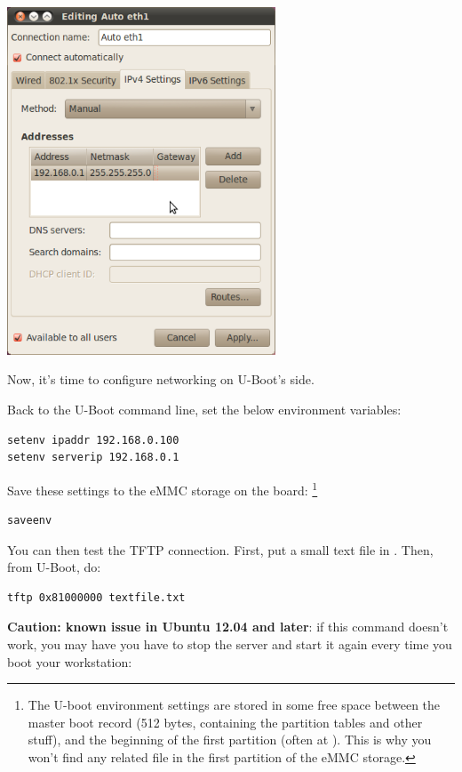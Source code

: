 \begin{center}
\includegraphics[width=8cm]{labs/kernel-board-setup/network-config-3.png}
\end{center}

Now, it's time to configure networking on U-Boot's side.

Back to the U-Boot command line, set the below environment variables:

\begin{verbatim}
setenv ipaddr 192.168.0.100
setenv serverip 192.168.0.1
\end{verbatim}

Save these settings to the eMMC storage on the board:
\footnote{The U-boot environment settings are stored in some free space
between the master boot record (512 bytes, containing the partition
tables and other stuff), and the beginning of the first partition (often
at ). This is why you won't find any related file in the
first partition of the eMMC storage.}

\begin{verbatim}
saveenv
\end{verbatim}

You can then test the TFTP connection.  First, put a small text
file in . Then, from U-Boot, do:

\begin{verbatim}
tftp 0x81000000 textfile.txt
\end{verbatim}

{\bf Caution: known issue in Ubuntu 12.04 and later}: if this command
doesn't work, you may have you have to stop the server and start it
again every time you boot your workstation:

